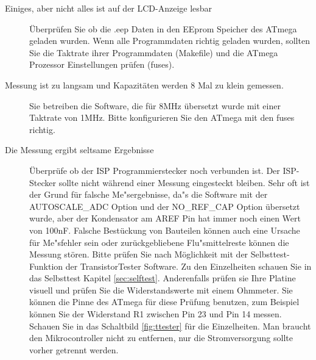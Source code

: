 \begin{description}
\item[Einiges, aber nicht alles ist auf der LCD-Anzeige lesbar] 
\"Uberpr\"ufen Sie ob die .eep Daten in den EEprom Speicher des ATmega geladen wurden.
Wenn alle Programmdaten richtig geladen wurden, sollten Sie die Taktrate ihrer
Programmdaten (Makefile) und die ATmega Prozessor Einstellungen pr\"ufen (fuses).

\item[Messung ist zu langsam und Kapazit\"aten werden 8 Mal zu klein gemessen.] 
Sie betreiben die Software, die f\"ur 8MHz \"ubersetzt wurde mit einer Taktrate von 1MHz.
Bitte konfigurieren Sie den ATmega mit den fuses richtig.

\item[Die Messung ergibt seltsame Ergebnisse]  
\"Uberpr\"ufe ob der ISP Programmierstecker noch verbunden ist.
Der ISP-Stecker sollte nicht w\"ahrend einer Messung eingesteckt bleiben.
Sehr oft ist der Grund f\"ur falsche Me"sergebnisse, da"s die Software mit der
 AUTOSCALE\_ADC Option und der NO\_REF\_CAP Option \"ubersetzt wurde, aber der
Kondensator am AREF Pin hat immer noch einen Wert von 100nF.
Falsche Best\"uckung von Bauteilen k\"onnen auch eine Ursache f\"ur Me"sfehler sein 
oder zur\"uckgebliebene Flu"smittelreste k\"onnen die Messung st\"oren.
Bitte pr\"ufen Sie nach M\"oglichkeit mit der Selbsttest-Funktion der
TransistorTester Software.
Zu den Einzelheiten schauen Sie in das Selbsttest Kapitel \ref{sec:selftest}.
Anderenfalls pr\"ufen sie Ihre Platine visuell und pr\"ufen Sie die Widerstandswerte
mit einem Ohmmeter. Sie k\"onnen die Pinne des ATmega f\"ur diese Pr\"ufung benutzen,
zum Beispiel k\"onnen Sie der Widerstand R1 zwischen Pin 23 und Pin 14 messen.
Schauen Sie in das Schaltbild \ref{fig:ttester} f\"ur die Einzelheiten.
Man braucht den Mikrocontroller nicht zu entfernen, nur die Stromversorgung sollte
vorher getrennt werden.

\end{description}
